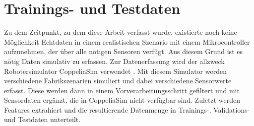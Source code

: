 \chapter{Trainings- und Testdaten}
Zu dem Zeitpunkt, zu dem diese Arbeit verfasst wurde, existierte noch keine Möglichkeit Echtdaten in einem
realistischen Szenario mit einem Mikrocontroller aufzunehmen, der über alle nötigen Sensoren verfügt.
Aus diesem Grund ist es nötig Daten simulativ zu erfassen.
\newline
\newline
Zur Datenerfassung wird der allzweck Robotersimulator CoppeliaSim verwendet \cite{coppeliaSim}.
Mit diesem Simulator werden verschiedene Fabrikszenarien simuliert und dabei verschiedene Sensorwerte erfasst.
Diese werden dann in einem Vorverarbeitungsschritt gefiltert und mit Sensordaten ergänzt, die in CoppeliaSim nicht verfügbar sind.
Zuletzt werden Features extrahiert und die resultierende Datenmenge in Trainings-, Validations- und Testdaten unterteilt.





